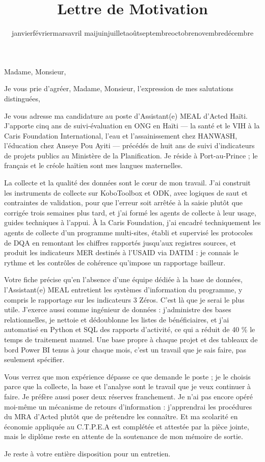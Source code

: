 \documentclass[10pt,a4paper,sans]{moderncv}
\title{Lettre de Motivation}
\renewcommand{\today}{\number\day\space\ifcase\month\or janvier\or février\or mars\or avril\or
mai\or juin\or juillet\or août\or septembre\or octobre\or novembre\or décembre\fi\space\number\year}
\begin{document}
\date{\today}
\opening{Madame, Monsieur,}
\closing{Je vous prie d'agréer, Madame, Monsieur, l'expression de mes salutations distinguées,}

\makelettertitle

Je vous adresse ma candidature au poste d'Assistant(e) MEAL d'Acted Haïti. J'apporte cinq ans de suivi-évaluation en ONG en Haïti --- la santé et le VIH à la Caris Foundation International, l'eau et l'assainissement chez HANWASH, l'éducation chez Anseye Pou Ayiti --- précédés de huit ans de suivi d'indicateurs de projets publics au Ministère de la Planification. Je réside à Port-au-Prince ; le français et le créole haïtien sont mes langues maternelles.

La collecte et la qualité des données sont le cœur de mon travail. J'ai construit les instruments de collecte sur KoboToolbox et ODK, avec logiques de saut et contraintes de validation, pour que l'erreur soit arrêtée à la saisie plutôt que corrigée trois semaines plus tard, et j'ai formé les agents de collecte à leur usage, guides techniques à l'appui. À la Caris Foundation, j'ai encadré techniquement les agents de collecte d'un programme multi-sites, établi et supervisé les protocoles de DQA en remontant les chiffres rapportés jusqu'aux registres sources, et produit les indicateurs MER destinés à l'USAID via DATIM : je connais le rythme et les contrôles de cohérence qu'impose un rapportage bailleur.

Votre fiche précise qu'en l'absence d'une équipe dédiée à la base de données, l'Assistant(e) MEAL entretient les systèmes d'information du programme, y compris le rapportage sur les indicateurs 3 Zéros. C'est là que je serai le plus utile. J'exerce aussi comme ingénieur de données : j'administre des bases relationnelles, je nettoie et dédoublonne les listes de bénéficiaires, et j'ai automatisé en Python et SQL des rapports d'activité, ce qui a réduit de 40 \% le temps de traitement manuel. Une base propre à chaque projet et des tableaux de bord Power BI tenus à jour chaque mois, c'est un travail que je sais faire, pas seulement spécifier.

Vous verrez que mon expérience dépasse ce que demande le poste ; je le choisis parce que la collecte, la base et l'analyse sont le travail que je veux continuer à faire. Je préfère aussi poser deux réserves franchement. Je n'ai pas encore opéré moi-même un mécanisme de retours d'information : j'apprendrai les procédures du MRA d'Acted plutôt que de prétendre les connaître. Et ma scolarité en économie appliquée au C.T.P.E.A est complétée et attestée par la pièce jointe, mais le diplôme reste en attente de la soutenance de mon mémoire de sortie.

Je reste à votre entière disposition pour un entretien.

\makeletterclosing
\end{document}
